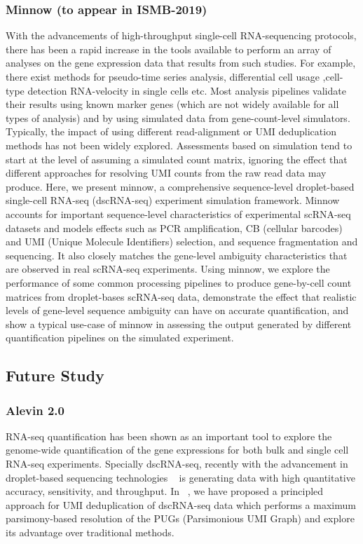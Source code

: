 \subsubsection{Minnow (to appear in ISMB-2019)}
With the advancements of high-throughput single-cell RNA-sequencing protocols, there 
has been a rapid increase in the tools available to perform an array of analyses on the 
gene expression data that results from such studies.  For example, there exist methods 
for pseudo-time series analysis, differential cell usage ,cell-type detection RNA-velocity 
in single cells etc. Most analysis pipelines validate their results using known marker 
genes (which are not widely available for all types of analysis) and by using simulated 
data from gene-count-level simulators. Typically, the impact of using different 
read-alignment or UMI deduplication methods has not been widely explored. Assessments 
based on simulation tend to start at the level of assuming a simulated count matrix, 
ignoring the effect that different approaches for resolving UMI counts from the raw read 
data may produce. Here, we present minnow, a comprehensive sequence-level droplet-based 
single-cell RNA-seq (dscRNA-seq) experiment simulation framework.  Minnow accounts for 
important sequence-level characteristics of experimental scRNA-seq datasets and models 
effects such as PCR amplification,  CB (cellular barcodes) and UMI (Unique Molecule 
Identifiers) selection, and sequence fragmentation and sequencing. It also closely matches 
the gene-level ambiguity characteristics that are observed in real scRNA-seq experiments.  
Using minnow, we explore the performance of some common processing pipelines to produce 
gene-by-cell count matrices from droplet-bases scRNA-seq data, demonstrate the effect that 
realistic levels of gene-level sequence ambiguity can have on accurate quantification, 
and show a typical use-case of minnow in assessing the output generated by different 
quantification pipelines on the simulated experiment.

\subsection{Future Study}
\subsubsection{Alevin 2.0}
RNA-seq quantification has been shown as an important tool to explore the genome-wide
quantification of the gene expressions for both bulk and single cell RNA-seq experiments. 
Specially dscRNA-seq, recently with the advancement in droplet-based sequencing technologies 
~\citet{dropseq, indrop, tenx} is generating data with high quantitative accuracy, 
sensitivity, and throughput. In ~, we have proposed a
principled approach for UMI deduplication of dscRNA-seq data which performs a maximum 
parsimony-based resolution of the PUGs (Parsimonious UMI Graph) and explore its advantage over 
traditional methods. 

